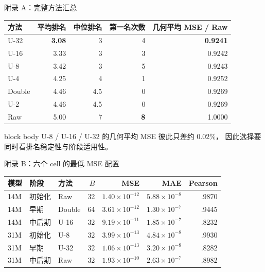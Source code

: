 \documentclass[10pt,aspectratio=169]{beamer}
\newcommand{\best}[1]{\textcolor{secondary}{\textbf{#1}}}
\begin{document}
\begin{frame}{附录 A：完整方法汇总}
  \small
  \centering
  \begin{tabular}{lrrrr}
    \toprule
    方法 & 平均排名 & 中位排名 & 第一名次数 & 几何平均 MSE / Raw \\
    \midrule
    U-32 & \best{3.08} & 3 & 4 & \best{0.9241} \\
    U-16 & 3.33 & 3 & 3 & 0.9242 \\
    U-8 & 3.42 & 3 & 5 & 0.9243 \\
    U-4 & 4.25 & 4 & 1 & 0.9252 \\
    Double & 4.46 & 4.5 & 0 & 0.9269 \\
    U-2 & 4.46 & 4.5 & 0 & 0.9269 \\
    Raw & 5.00 & 7 & \best{8} & 1.0000 \\
    \bottomrule
  \end{tabular}
  \vspace{4mm}
  \begin{beamercolorbox}[rounded=true,sep=.7em,wd=.88\textwidth]{block body}
    U-8 / U-16 / U-32 的几何平均 MSE 彼此只差约 0.02\%，
    因此选择要同时看排名稳定性与阶段适用性。
  \end{beamercolorbox}
\end{frame}

\begin{frame}{附录 B：六个 cell 的最低 MSE 配置}
  \scriptsize
  \centering
  \begin{tabular}{lllrrrr}
    \toprule
    模型 & 阶段 & 方法 & $B$ & MSE & MAE & Pearson \\
    \midrule
    14M & 初始化 & Raw & 32 & $1.40{\times}10^{-12}$ & $5.88{\times}10^{-8}$ & .9870 \\
    14M & 早期 & Double & 64 & $3.61{\times}10^{-12}$ & $1.30{\times}10^{-7}$ & .9445 \\
    14M & 中后期 & U-16 & 32 & $9.19{\times}10^{-11}$ & $1.85{\times}10^{-7}$ & .8232 \\
    31M & 初始化 & U-8 & 32 & $3.99{\times}10^{-13}$ & $4.84{\times}10^{-8}$ & .9930 \\
    31M & 早期 & U-32 & 32 & $1.06{\times}10^{-13}$ & $3.20{\times}10^{-8}$ & .8282 \\
    31M & 中后期 & Raw & 32 & $1.93{\times}10^{-10}$ & $2.63{\times}10^{-7}$ & .8982 \\
    \bottomrule
  \end{tabular}
\end{frame}
\end{document}
